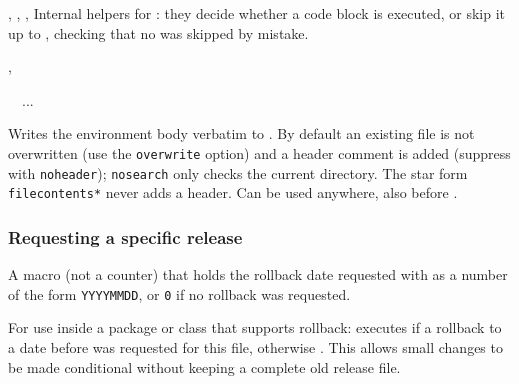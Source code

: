 \documentclass{l3in2edoc}
\begin{document}
\begin{function}[int]
  {
    \@IncludeInRelease,
    \@check@IncludeInRelease,
    \@end@check@IncludeInRelease,
    \@gobble@IncludeInRelease
  }
  Internal helpers for : they decide whether a
  code block is executed, or skip it up to ,
  checking that no  was skipped by mistake.
\end{function}




\begin{function}[user]
  {
    \filecontents,
    \endfilecontents
  }
  \begin{syntax}
    \ \  ...
  \end{syntax}
  Writes the environment body verbatim to . By default
  an existing file is not overwritten (use the \texttt{overwrite}
  option) and a header comment is added (suppress with
  \texttt{noheader}); \texttt{nosearch} only checks the current
  directory. The star form \texttt{filecontents*} never adds a
  header. Can be used anywhere, also before .
\end{function}


\subsubsection{Requesting a specific release}

\begin{function}[]
  {
    \requestedLaTeXdate
  }
  A macro (not a counter) that holds the rollback date requested with
   as a number of the form \texttt{YYYYMMDD}, or
  \texttt{0} if no rollback was requested.
\end{function}



\begin{function}[]
  {
    \IfTargetDateBefore
  }
  \begin{syntax}
       
  \end{syntax}
  For use inside a package or class that supports rollback: executes
   if a rollback to a date before  was
  requested for this file, otherwise . This allows
  small changes to be made conditional without keeping a complete old
  release file.
\end{function}
\end{document}
